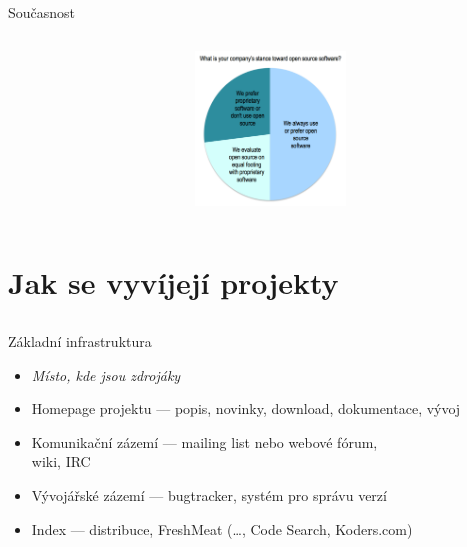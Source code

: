 \documentclass{beamer}
\begin{document}
\subsection{}
\begin{frame}{Současnost}
\begin{columns}
\begin{column}{7cm}
\end{column}
\begin{column}{4cm}
\includegraphics[width=4cm]{Prefer-Or-Prevent.png}
\end{column}
\end{columns}
\end{frame}


\section{Jak se vyvíjejí projekty}

\subsection{}
\begin{frame}{Základní infrastruktura}
\begin{itemize}
\item {\em Místo, kde jsou zdrojáky}
\item Homepage projektu --- popis, novinky, download, dokumentace, vývoj
\item Komunikační zázemí --- mailing list nebo webové fórum,\\wiki, IRC
\item Vývojářské zázemí --- bugtracker, systém pro správu verzí
\item Index --- distribuce, FreshMeat (\dots, Code Search, Koders.com)
\end{itemize}
\end{frame}
\end{document}
